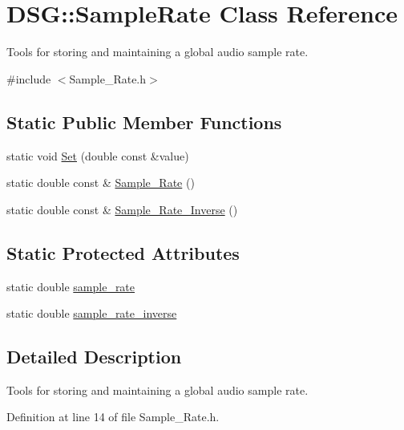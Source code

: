 \hypertarget{classDSG_1_1SampleRate}{\section{D\+S\+G\+:\+:Sample\+Rate Class Reference}
\label{classDSG_1_1SampleRate}
}


Tools for storing and maintaining a global audio sample rate.  




{\ttfamily \#include $<$Sample\+\_\+\+Rate.\+h$>$}

\subsection*{Static Public Member Functions}
\begin{DoxyCompactItemize}
\item 
static void \hyperlink{classDSG_1_1SampleRate_a20fbf652a8b305df17940d64ca3593a8}{Set} (double const \&value)
\item 
static double const \& \hyperlink{classDSG_1_1SampleRate_ae64b5675efed1e2b8627fbe407b8cb91}{Sample\+\_\+\+Rate} ()
\item 
static double const \& \hyperlink{classDSG_1_1SampleRate_ab7f5b3d837151019b5bc0642b3337bd8}{Sample\+\_\+\+Rate\+\_\+\+Inverse} ()
\end{DoxyCompactItemize}
\subsection*{Static Protected Attributes}
\begin{DoxyCompactItemize}
\item 
static double \hyperlink{classDSG_1_1SampleRate_a09608252c62dcf0f0437f64f93324e57}{sample\+\_\+rate}
\item 
static double \hyperlink{classDSG_1_1SampleRate_a17f5dfa529560272a0c9c917e3e2a41f}{sample\+\_\+rate\+\_\+inverse}
\end{DoxyCompactItemize}


\subsection{Detailed Description}
Tools for storing and maintaining a global audio sample rate. 

Definition at line 14 of file Sample\+\_\+\+Rate.\+h.



